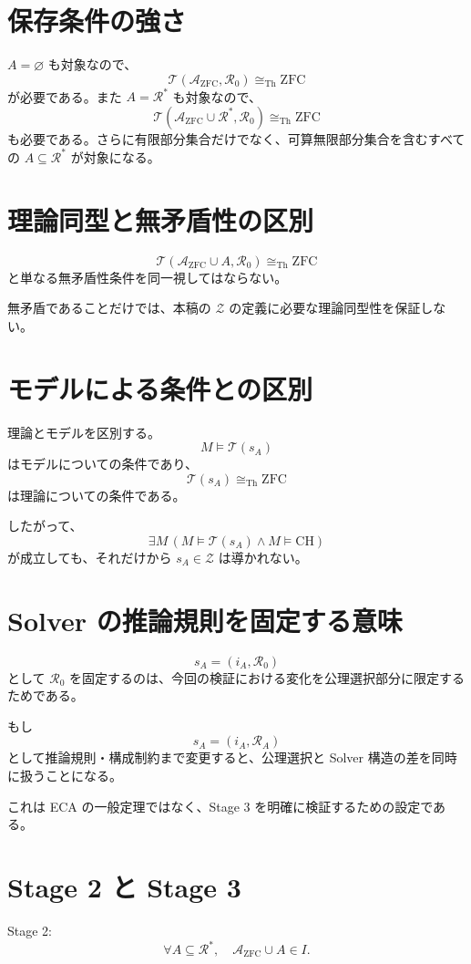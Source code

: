 \documentclass[a4paper,11pt]{ltjsarticle}
\begin{document}
\section{保存条件の強さ}
\(A=\varnothing\) も対象なので、
\[
\mathcal{T}(\mathcal{A}_{\mathrm{ZFC}},\mathcal{R}_0)
\cong_{\mathrm{Th}}\mathrm{ZFC}
\]
が必要である。また \(A=\mathcal{R}^*\) も対象なので、
\[
\mathcal{T}(\mathcal{A}_{\mathrm{ZFC}}\cup\mathcal{R}^*,\mathcal{R}_0)
\cong_{\mathrm{Th}}\mathrm{ZFC}
\]
も必要である。さらに有限部分集合だけでなく、可算無限部分集合を含むすべての \(A\subseteq\mathcal{R}^*\) が対象になる。

\section{理論同型と無矛盾性の区別}
\[
\mathcal{T}(\mathcal{A}_{\mathrm{ZFC}}\cup A,\mathcal{R}_0)
\cong_{\mathrm{Th}}\mathrm{ZFC}
\]
と単なる無矛盾性条件を同一視してはならない。

無矛盾であることだけでは、本稿の \(\mathcal{Z}\) の定義に必要な理論同型性を保証しない。

\section{モデルによる条件との区別}
理論とモデルを区別する。
\[
M\models\mathcal{T}(s_A)
\]
はモデルについての条件であり、
\[
\mathcal{T}(s_A)\cong_{\mathrm{Th}}\mathrm{ZFC}
\]
は理論についての条件である。

したがって、
\[
\exists M\,
(M\models\mathcal{T}(s_A)\land M\models\mathrm{CH})
\]
が成立しても、それだけから \(s_A\in\mathcal{Z}\) は導かれない。

\section{Solver の推論規則を固定する意味}
\[
s_A=(i_A,\mathcal{R}_0)
\]
として \(\mathcal{R}_0\) を固定するのは、今回の検証における変化を公理選択部分に限定するためである。

もし
\[
s_A=(i_A,\mathcal{R}_A)
\]
として推論規則・構成制約まで変更すると、公理選択と Solver 構造の差を同時に扱うことになる。

これは ECA の一般定理ではなく、Stage 3 を明確に検証するための設定である。

\section{Stage 2 と Stage 3}
Stage 2:
\[
\forall A\subseteq\mathcal{R}^*,
\quad
\mathcal{A}_{\mathrm{ZFC}}\cup A\in I.
\]
\end{document}
